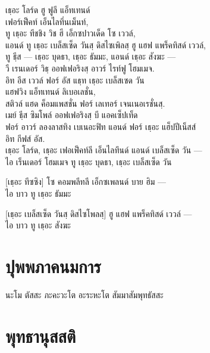 \begin{thaitrans}
 เธฺอะ โลร์ด ฮู ฟูลี แอ็ทเทนด์\\
\vin เฟอร์เฟ็คท์ เอ็นไลทึ่นเม็นท์,\\
ทู เธฺอะ ทีชชิง วิช ฮี เอ็กซปาวเด็ด โซ เววล์,\\
แอนด์ ทู เธฺอะ เบล็สเซ็ด วันสฺ ดิสไซเพิลสฺ ฮู แฮฟ แพร็คทิสด์ เววล์,\\
ทู ธีฺส — เธฺอะ บุดธา, เธฺอะ ธัมมะ, แอนด์ เธฺอะ สังฆะ —\\
วี เรนเดอร์ วิธฺ ออฟเฟอริงสฺ อาวร์ ไรท์ฟู โฮมเมจ.\\
อิท อีส เววล์ ฟอร์ อัส แธฺท เธฺอะ เบล็สเซด วัน\\
\vin แฮฟวิง แอ็ทเทนด์ ลิเบอเลชั่น,\\
สติวล์ แฮด ค็อมแพสชั่น ฟอร์ เลเทอร์ เจนเนอเรชั่นสฺ.\\
เมย์ ธีฺส ซิมโพล์ ออฟเฟอริงสฺ บี แอคเซ็ปเท็ด\\
ฟอร์ อาวร์ ลองลาสทิง เบเนอะฟิท แอนด์ ฟอร์ เธฺอะ แฮ็ปปีเน็สส์\\
\vin อิท กีฟส์ อัส.\\
เธฺอะ โลร์ด, เธฺอะ เฟอเฟ็คท์ลี เอ็นไลทึนด์ แอนด์ เบล็สเซ็ด วัน —\\
ไอ เร็นเดอร์ โฮมเมจ ทู เธฺอะ บุดธา, เธฺอะ เบล็สเซ็ด วัน

[เธฺอะ ทีซซิง] โซ คอมพลีทลี เอ็กซเพลนด์ บาย ฮิม —\\
ไอ บาว ทู เธฺอะ ธัมมะ

[เธฺอะ เบล็สเซ็ด วันสฺ ดิสไซโพลสฺ] ฮู แฮฟ แพร็คทิสด์ เววล์ —\\
ไอ บาว ทู เธฺอะ สังฆะ
\end{thaitrans}
\clearpage

\chapter*{ปุพพภาคนมการ}
\delegateSetUseNext

\begin{leader}
\end{leader}

\begin{thaitrans}
นะโม ตัสสะ ภะคะวะโต อะระหะโต สัมมาสัมพุทธัสสะ\\
\end{thaitrans}

\chapter*{พุทธานุสสติ}
\delegateSetUseNext

